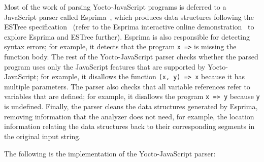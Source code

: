 \documentclass[12pt, oneside]{book}
\begin{document}
Most of the work of parsing Yocto-JavaScript programs is deferred to a JavaScript parser called Esprima~\cite{esprima}, which produces data structures following the ESTree specification~\cite{estree} (refer to the Esprima interactive online demonstration~\cite{esprima-demonstration} to explore Esprima and ESTree further). Esprima is also responsible for detecting syntax errors; for example, it detects that the program \texttt{x =>} is missing the function body. The rest of the Yocto-JavaScript parser checks whether the parsed program uses only the JavaScript features that are supported by Yocto-JavaScript; for example, it disallows the function \texttt{(x, y) => x} because it has multiple parameters. The parser also checks that all variable references refer to variables that are defined; for example, it disallows the program \texttt{x => y} because \texttt{y} is undefined. Finally, the parser cleans the data structures generated by Esprima, removing information that the analyzer does not need, for example, the location information relating the data structures back to their corresponding segments in the original input string.

The following is the implementation of the Yocto-JavaScript parser:
\end{document}
